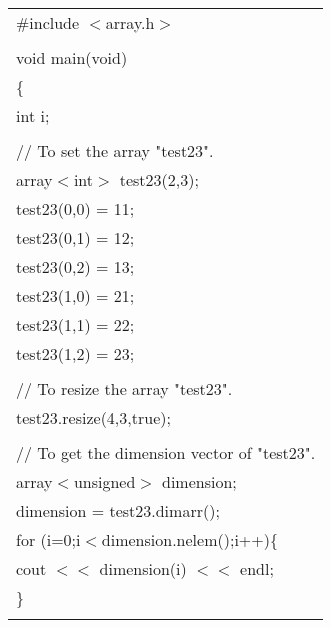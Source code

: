 {\small
\begin{center}
\begin{tabular}{|l|}\hline
\#include $<$array.h$>$\\
\hspace*{\textwidth}\\
void main(void)\\
\{\\
\hspace*{10mm}int i;\\
\\
\hspace*{10mm}// To set the array "test23".\\
\hspace*{10mm}array$<$int$>$ test23(2,3);\\
\hspace*{10mm}test23(0,0) = 11;\\
\hspace*{10mm}test23(0,1) = 12;\\
\hspace*{10mm}test23(0,2) = 13;\\
\hspace*{10mm}test23(1,0) = 21;\\
\hspace*{10mm}test23(1,1) = 22;\\
\hspace*{10mm}test23(1,2) = 23;\\
\\
\hspace*{10mm}// To resize the array "test23".\\
\hspace*{10mm}test23.resize(4,3,true);\\
\\
\hspace*{10mm}// To get the dimension vector of "test23".\\
\hspace*{10mm}array$<$unsigned$>$ dimension;\\
\hspace*{10mm}dimension = test23.dimarr();\\
\hspace*{10mm}for (i=0;i$<$dimension.nelem();i++)\{\\
\hspace*{20mm}cout $<<$ dimension(i) $<<$ endl;\\
\hspace*{10mm}\}\\
\\

\end{tabular}
\end{center}}
